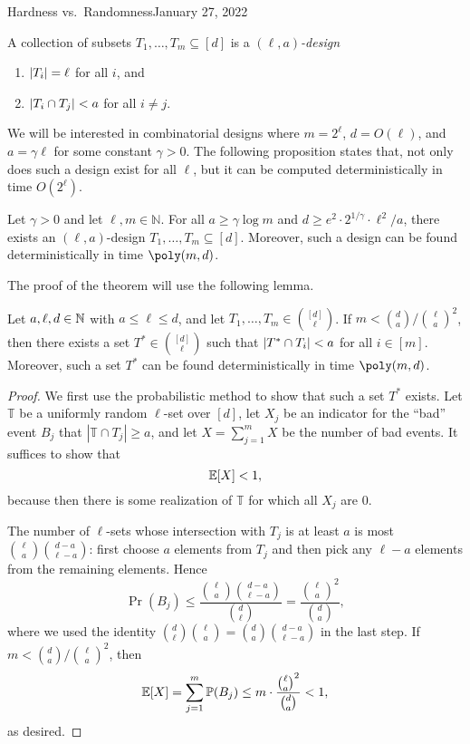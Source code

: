\begin{lecture}{2}{Hardness vs.\ Randomness}{January 27, 2022}
\begin{definition}
  A collection of subsets $T_1, \dots, T_m \subseteq [d]$ is a \emph{$(\ell, a)$-design}
	\begin{enumerate}
    \item $\lvert T_i\rvert = \ell$ for all $i$, and
		\item $\lvert T_i \cap T_j\rvert < a$ for all $i \ne j$.
	\end{enumerate}
\end{definition}

We will be interested in combinatorial designs where $m = 2^\ell$, $d =
O(\ell)$, and $a = \gamma \ell$ for some constant $\gamma > 0$. The following
proposition states that, not only does such a design exist for all $\ell$,
but it can be computed deterministically in time $O(2^\ell)$.

\begin{theorem}\label{thm:design}
  Let $\gamma > 0 $ and let $\ell, m \in \mathbb{N}$. For all $a \ge \gamma
  \log{m}$ and $d \ge e^2 \cdot 2^{1/\gamma} \cdot \ell^2/a$, there exists an
  $(\ell, a)$-design $T_1, \dots, T_m \subseteq [d]$. Moreover, such a design
  can be found deterministically in time $\poly(m, d)$.
\end{theorem}

The proof of the theorem will use the following lemma.
\begin{lemma}\label{lem:design}
  Let $a, \ell, d \in \mathbb{N}$ with $a \le \ell \le d$, and let $T_1, \dots, T_m \in
  \binom{[d]}{\ell}$. If $m < \binom{d}{a} / \binom{\ell}{a}^2$, then there
  exists a set $T^* \in \binom{[d]}{\ell}$ such that $\lvert T^* \cap T_i\rvert < a$
  for all $i \in [m]$. Moreover, such a set $T^*$ can be found
  deterministically in time $\poly(m, d)$.
\end{lemma}

\begin{proof}
  We first use the probabilistic method to show that such a set $T^*$ exists.
  Let $\mathbb{T}$ be a uniformly random $\ell$-set over $[d]$, let $X_j$
  be an indicator for the ``bad'' event $B_j$ that $|\mathbb{T} \cap T_j| \ge
  a$, and let $X = \sum_{j=1}^m X$ be the number of bad events. It suffices to
  show that \[
    \Exp\brac*{X} < 1,
  \]
  because then there is some realization of $\mathbb{T}$ for which all $X_j$
  are 0.

  The number of $\ell$-sets whose intersection with $T_j$ is at least $a$ is
  most $\binom{\ell}{a}\binom{d - a}{\ell - a}$: first choose $a$ elements from
  $T_j$ and then pick any $\ell - a$ elements from the remaining elements. Hence
  \[
    \Pr(B_j) \le \frac{\binom{\ell}{a}\binom{d - a}{\ell - a}}{\binom{d}{\ell}} =
    \frac{\binom{\ell}{a}^2}{\binom{d}{a}},
  \]
  where we used the identity $\binom{d}{\ell}\binom{\ell}{a} =
  \binom{d}{a}\binom{d - a}{\ell - a}$ in the last step. If $m < \binom{d}{a} /
  \binom{\ell}{a}^2$, then \[
    \Exp\brac*{X} =
    \sum_{j=1}^m \Pr(B_j) \le m \cdot \frac{\binom{\ell}{a}^2}{\binom{d}{a}} < 1,
  \]
  as desired.


\end{proof}
\end{lecture}
